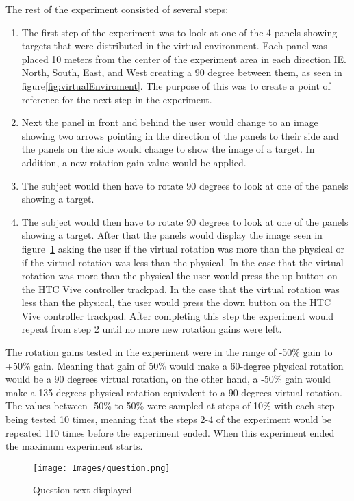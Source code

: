 \noindent
The rest of the experiment consisted of several steps:
\begin{enumerate}
    \item The first step of the experiment was to look at one of the 4 panels showing targets that were distributed in the virtual environment. Each panel was placed 10 meters from the center of the experiment area in each direction IE. North, South, East, and West creating a 90 degree between them, as seen in figure\ref{fig:virtualEnviroment}. The purpose of this was to create a point of reference for the next step in the experiment.
    \item Next the panel in front and behind the user would change to an image showing two arrows pointing in the direction of the panels to their side and the panels on the side would change to show the image of a target. In addition, a new rotation gain value would be applied.
    \item The subject would then have to rotate 90 degrees to look at one of the panels showing a target.
    \item The subject would then have to rotate 90 degrees to look at one of the panels showing a target. After that the panels would display the image seen in figure~\ref{fig:question} asking the user if the virtual rotation was more than the physical or if the virtual rotation was less than the physical. In the case that the virtual rotation was more than the physical the user would press the up button on the HTC Vive controller trackpad. In the case that the virtual rotation was less than the physical, the user would press the down button on the HTC Vive controller trackpad. After completing this step the experiment would repeat from step 2 until no more new rotation gains were left. %
\end{enumerate}

\noindent
The rotation gains tested in the experiment were in the range of -50\% gain to +50\% gain. Meaning that gain of 50\% would make a 60-degree physical rotation would be a 90 degrees virtual rotation, on the other hand, a -50\% gain would make a 135 degrees physical rotation equivalent to a 90 degrees virtual rotation. The values between -50\% to 50\% were sampled at steps of 10\% with each step being tested 10 times, meaning that the steps 2-4 of the experiment would be repeated 110 times before the experiment ended. When this experiment ended the maximum experiment starts.

\begin{figure}[htb!]
    \centering
    \texttt{[image: Images/question.png]}
    \caption{Question text displayed}
    \label{fig:question}
\end{figure}

